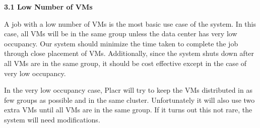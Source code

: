 \documentclass[11pt]{article}
\begin{document}
\Large{\textbf{3.1 Low Number of VMs}}

\normalsize
A job with a low number of VMs is the most basic use case of the system.  In this case, all VMs will be in the same group unless the data center has very low occupancy. Our system should minimize the time taken to complete the job through close placement of VMs. Additionally, since the system shuts down after all VMs are in the same group, it should be cost effective except in the case of very low occupancy.

In the very low occupancy case, Placr will try to keep the VMs distributed in as few groups as possible and in the same cluster.  Unfortunately it will also use two extra VMs until all VMs are in the same group.  If it turns out this not rare, the system will need modifications.
\end{document}
